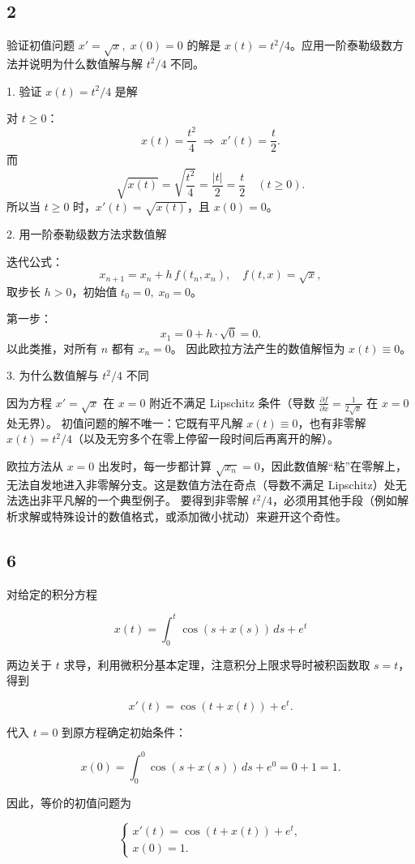 \documentclass{article}
\begin{document}
\subsection*{2}
验证初值问题 \(x'=\sqrt{x},\; x(0)=0\) 的解是 \(x(t)=t^2/4\)。应用一阶泰勒级数方法并说明为什么数值解与解 \(t^2/4\) 不同。

1. 验证 \(x(t)=t^2/4\) 是解

对 \(t \ge 0\)：
\[
x(t) = \frac{t^2}{4} \;\Longrightarrow\; x'(t) = \frac{t}{2}.
\]
而
\[
\sqrt{x(t)} = \sqrt{\frac{t^2}{4}} = \frac{|t|}{2} = \frac{t}{2} \quad (t \ge 0).
\]
所以当 \(t \ge 0\) 时，\(x'(t) = \sqrt{x(t)}\)，且 \(x(0)=0\)。  

2. 用一阶泰勒级数方法求数值解

迭代公式：
\[
x_{n+1} = x_n + h\, f(t_n, x_n), \quad f(t,x) = \sqrt{x},
\]
取步长 \(h>0\)，初始值 \(t_0=0,\; x_0=0\)。

第一步：
\[
x_1 = 0 + h \cdot \sqrt{0} = 0.
\]
以此类推，对所有 \(n\) 都有 \(x_n = 0\)。  
因此欧拉方法产生的数值解恒为 \(x(t) \equiv 0\)。

3. 为什么数值解与 \(t^2/4\) 不同

因为方程 \(x' = \sqrt{x}\) 在 \(x=0\) 附近不满足 Lipschitz 条件（导数 \(\frac{\partial f}{\partial x} = \frac{1}{2\sqrt{x}}\) 在 \(x=0\) 处无界）。  
初值问题的解不唯一：它既有平凡解 \(x(t) \equiv 0\)，也有非零解 \(x(t) = t^2/4\)（以及无穷多个在零上停留一段时间后再离开的解）。

欧拉方法从 \(x=0\) 出发时，每一步都计算 \(\sqrt{x_n} = 0\)，因此数值解“粘”在零解上，无法自发地进入非零解分支。这是数值方法在奇点（导数不满足 Lipschitz）处无法选出非平凡解的一个典型例子。  
要得到非零解 \(t^2/4\)，必须用其他手段（例如解析求解或特殊设计的数值格式，或添加微小扰动）来避开这个奇性。

\subsection*{6}

对给定的积分方程

\[
x(t) = \int_{0}^{t} \cos(s + x(s)) \, ds + e^{t}
\]

两边关于 \(t\) 求导，利用微积分基本定理，注意积分上限求导时被积函数取 \(s=t\)，得到

\[
x'(t) = \cos(t + x(t)) + e^{t}.
\]

代入 \(t=0\) 到原方程确定初始条件：

\[
x(0) = \int_{0}^{0} \cos(s+x(s))\,ds + e^{0} = 0 + 1 = 1.
\]

因此，等价的初值问题为

\[
\begin{cases}
x'(t) = \cos(t + x(t)) + e^{t}, \\[4pt]
x(0) = 1.
\end{cases}
\]
\end{document}
